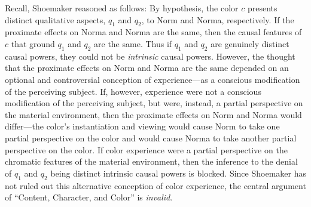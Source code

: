 \documentclass[12pt]{article}
\begin{document}

Recall, Shoemaker reasoned as follows: By hypothesis, the color \(c\) presents distinct qualitative aspects, \(q_1\) and \(q_2\), to Norm and Norma, respectively. If the proximate effects on Norma and Norma are the same, then the causal features of \(c\) that ground \(q_1\) and \(q_2\) are the same. Thus if \(q_1\) and \(q_2\) are genuinely distinct causal powers, they could not be \emph{intrinsic} causal powers. However, the thought that the proximate effects on Norm and Norma are the same depended on an optional and controversial conception of experience---as a conscious modification of the perceiving subject. If, however, experience were not a conscious modification of the perceiving subject, but were, instead, a partial perspective on the material environment, then the proximate effects on Norm and Norma would differ---the color's instantiation and viewing would cause Norm to take one partial perspective on the color and would cause Norma to take another partial perspective on the color. If color experience were a partial perspective on the chromatic features of the material environment, then the inference to the denial of \(q_1\) and \(q_2\) being distinct intrinsic causal powers is blocked. Since Shoemaker has not ruled out this alternative conception of color experience, the central argument of ``Content, Character, and Color'' is \emph{invalid}.
\end{document}
